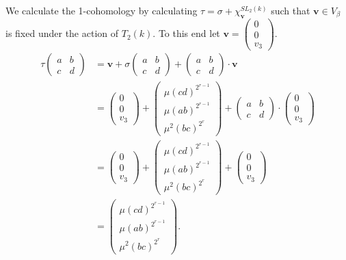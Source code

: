 We calculate the 1-cohomology by calculating $\tau = \sigma + \chi^{SL_2(k)}_\mathbf{v}$ such that $\mathbf{v} \in V_\beta$ is fixed under the action of $T_2(k)$. To this end let $\mathbf{v} = \left(\begin{matrix}0 \\ 0 \\ v_3\end{matrix}\right)$.
\begin{align*}
\tau\left(\begin{matrix} a & b \\ c & d \end{matrix}\right) &=
\mathbf{v} + \sigma\left(\begin{matrix} a & b \\ c & d \end{matrix}\right) + 
\left(\begin{matrix} a & b \\ c & d \end{matrix}\right) \cdot \mathbf{v} \\
 &=
\left(\begin{matrix} 0 \\ 0 \\ v_3 \end{matrix}\right) + 
\left(\begin{matrix}  \mu(cd)^{2^{r-1}}  \\ \mu\left(ab \right)^{2^{r-1}} \\ \mu^2\left( bc \right)^{2^r} \end{matrix}\right)+ 
\left(\begin{matrix} a & b \\ c & d \end{matrix}\right) \cdot 
\left(\begin{matrix} 0 \\ 0 \\ v_3 \end{matrix}\right) \\
 &=
\left(\begin{matrix} 0 \\ 0 \\ v_3 \end{matrix}\right) + 
\left(\begin{matrix}  \mu(cd)^{2^{r-1}}  \\ \mu\left(ab \right)^{2^{r-1}} \\ \mu^2\left( bc \right)^{2^r} \end{matrix}\right)+ 
\left(\begin{matrix} 0 \\ 0 \\ v_3 \end{matrix}\right) \\
&= \left(\begin{matrix}  \mu(cd)^{2^{r-1}}  \\ \mu\left(ab \right)^{2^{r-1}} \\ \mu^2\left( bc \right)^{2^r} \end{matrix}\right).
\end{align*}
